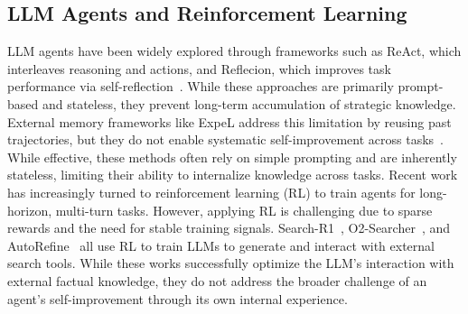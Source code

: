 \subsection{LLM Agents and Reinforcement Learning}
LLM agents have been widely explored through frameworks such as ReAct, which interleaves reasoning and actions, and Reflecion, which improves task performance via self-reflection~\citep{yao2023reactsynergizingreasoningacting,shinn2023reflexionlanguageagentsverbal}. While these approaches are primarily prompt-based and stateless, they prevent long-term accumulation of strategic knowledge. External memory frameworks like ExpeL address this limitation by reusing past trajectories, but they do not enable systematic self-improvement across tasks~\citep{zhao2024expelllmagentsexperiential}. While effective, these methods often rely on simple prompting and are inherently stateless, limiting their ability to internalize knowledge across tasks. Recent work has increasingly turned to reinforcement learning (RL) to train agents for long-horizon, multi-turn tasks. However, applying RL is challenging due to sparse rewards and the need for stable training signals. Search-R1~\citep{jin2025searchr1trainingllmsreason}, O2-Searcher~\citep{mei2025o2searchersearchingbasedagentmodel}, and AutoRefine~\citep{shi2025searchrefinethinkautonomous} all use RL to train LLMs to generate and interact with external search tools. While these works successfully optimize the LLM's interaction with external factual knowledge, they do not address the broader challenge of an agent's self-improvement through its own internal experience.



